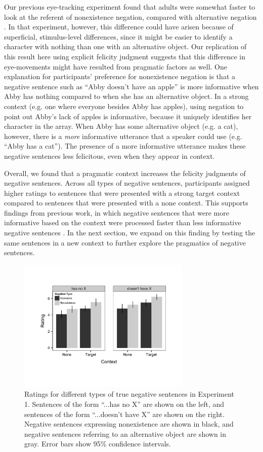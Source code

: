 \documentclass[10pt,letterpaper]{article}
\begin{document}
Our previous eye-tracking experiment found that adults were somewhat faster to look at the referent of nonexistence negation, compared with alternative negation \cite{nordmeyer2014b}. In that experiment, however, this difference could have arisen because of superficial, stimulus-level differences, since it might be easier to identify a character with nothing than one with an alternative object. Our replication of this result here using explicit felicity judgment suggests that this difference in eye-movements might have resulted from pragmatic factors as well. One explanation for participants' preference for nonexistence negation is that a negative sentence such as ``Abby doesn't have an apple'' is more informative when Abby has nothing compared to when she has an alternative object.  In a strong context (e.g. one where everyone besides Abby has apples), using negation to point out Abby's lack of apples is informative, because it uniquely identifies her character in the array.  When Abby has some alternative object (e.g. a cat), however, there is a \emph{more} informative utterance that a speaker could use (e.g. ``Abby has a cat'').  The presence of a more informative utterance makes these negative sentences less felicitous, even when they appear in context.

Overall, we found that a pragmatic context increases the felicity judgments of negative sentences.  Across all types of negative sentences, participants assigned higher ratings to sentences that were presented with a strong target context compared to sentences that were presented with a none context.  This supports findings from previous work, in which negative sentences that were more informative based on the context were processed faster than less informative negative sentences \cite{nordmeyer2014}.  In the next section, we expand on this finding by testing the same sentences in a new context to further explore the pragmatics of negative sentences.

\begin{figure}
\begin{center} 
\includegraphics[width=3.25in]{figures/study1.pdf}
\caption{\label{fig:s1} Ratings for different types of true negative sentences in Experiment 1.  Sentences of the form ``...has no X'' are shown on the left, and sentences of the form ``...doesn't have X'' are shown on the right.  Negative sentences expressing nonexistence are shown in black, and negative sentences referring to an alternative object are shown in gray.  Error bars show 95\% confidence intervals.}
\end{center} 
\end{figure}
\end{document}
